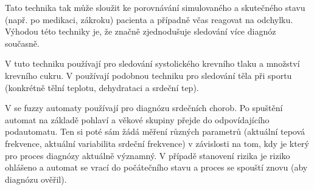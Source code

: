 \documentclass[a4paper,10pt]{article}
\begin{document}
Tato technika tak může sloužit ke porovnávání simulovaného a skutečného stavu (např. po medikaci, zákroku) pacienta a případně včas reagovat na odchylku. Výhodou této techniky je, že značně zjednodušuje sledování více diagnóz současně.

V \cite{GupRah-CliMonUsFuzSys} tuto techniku používají pro sledování systolického krevního tlaku a množství krevního cukru. V \cite{Jia+-ExHeaSimMetBasIntHumTheMod} používají podobnou techniku pro sledování těla při sportu (konkrétně tělní teplotu, dehydrataci a srdeční tep).

V \cite{CamMerNun-UsFuzAutDiagPrHeaPro} se fuzzy automaty používají pro diagnózu srdečních chorob. Po spuštění automat na základě pohlaví a věkové skupiny přejde do odpovídajícího podautomatu. Ten si poté sám žádá měření různých parametrů (aktuální tepová frekvence, aktuální variabilita srdeční frekvence) v závislosti na tom, kdy je který pro proces diagnózy aktuálně významný. V případě stanovení rizika je riziko ohlášeno a automat se vrací do počátečního stavu a proces se spouští znovu (aby diagnózu ověřil). 
\end{document}
